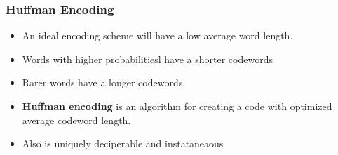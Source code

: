 \documentclass{beamer}
\begin{document}
\begin{frame}
\frametitle{Huffman Encoding}
\begin{itemize}
\item An ideal encoding scheme will have a low average word length.
\item Words with higher probabilitiesl have a shorter codewords
\item Rarer words have a longer codewords.
\item \textbf{Huffman encoding} is an algorithm for creating a code with optimized average codeword length.
\item Also is uniquely deciperable and instataneaous

\end{itemize}
\end{frame}
\end{document}
